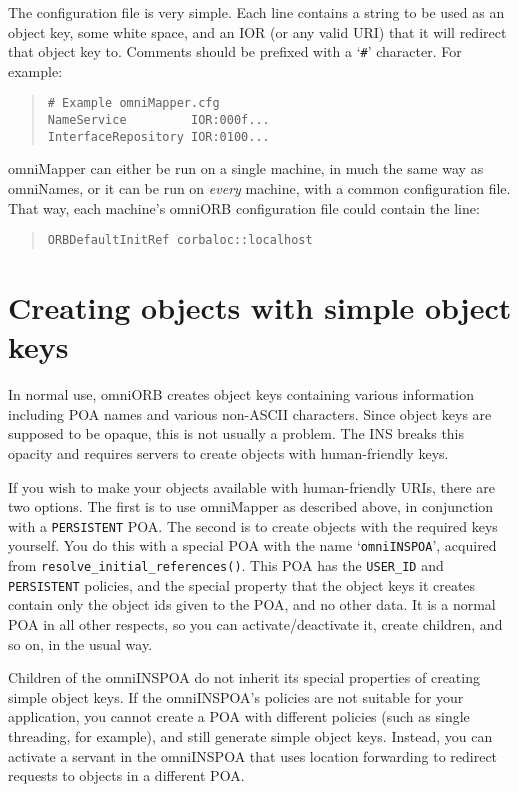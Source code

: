 \documentclass[draft,11pt,twoside,a4paper]{book}
\newcommand{\code}[1]{\texttt{#1}}
\newcommand{\op}[1]{\texttt{#1()}}
\begin{document}
The configuration file is very simple. Each line contains a string to
be used as an object key, some white space, and an IOR (or any valid
URI) that it will redirect that object key to. Comments should be
prefixed with a `\texttt{\#}' character. For example:

\begin{quote}
\begin{verbatim}
# Example omniMapper.cfg
NameService         IOR:000f...
InterfaceRepository IOR:0100...
\end{verbatim}
\end{quote}

omniMapper can either be run on a single machine, in much the same way
as omniNames, or it can be run on \emph{every} machine, with a common
configuration file. That way, each machine's omniORB configuration
file could contain the line:

\begin{quote}
\begin{verbatim}
ORBDefaultInitRef corbaloc::localhost
\end{verbatim}
\end{quote}



\section{Creating objects with simple object keys}

In normal use, omniORB creates object keys containing various
information including POA names and various non-ASCII characters.
Since object keys are supposed to be opaque, this is not usually a
problem. The INS breaks this opacity and requires servers to create
objects with human-friendly keys.

If you wish to make your objects available with human-friendly URIs,
there are two options. The first is to use omniMapper as described
above, in conjunction with a \code{PERSISTENT} POA. The second is to
create objects with the required keys yourself. You do this with a
special POA with the name `\texttt{omniINSPOA}', acquired from
\op{resolve\_initial\_references}. This POA has the \code{USER\_ID}
and \code{PERSISTENT} policies, and the special property that the
object keys it creates contain only the object ids given to the POA,
and no other data. It is a normal POA in all other respects, so you
can activate/deactivate it, create children, and so on, in the usual
way.

Children of the omniINSPOA do not inherit its special properties of
creating simple object keys. If the omniINSPOA's policies are not
suitable for your application, you cannot create a POA with different
policies (such as single threading, for example), and still generate
simple object keys. Instead, you can activate a servant in the
omniINSPOA that uses location forwarding to redirect requests to
objects in a different POA.
\end{document}
